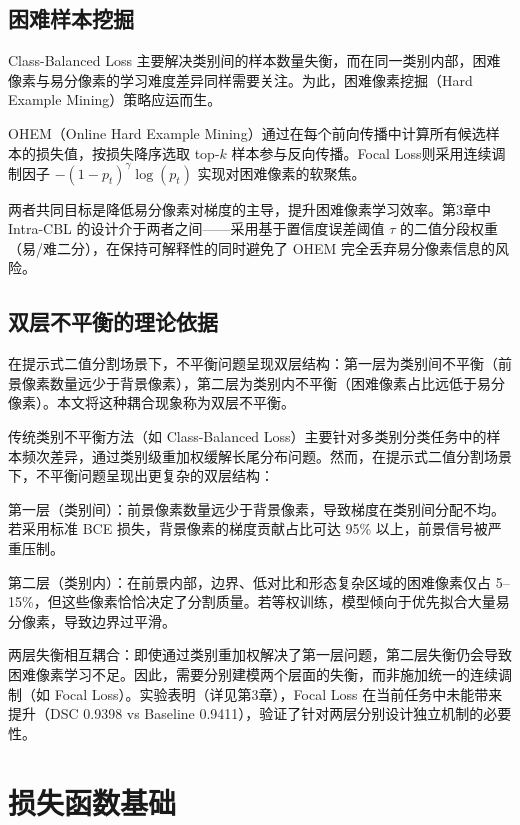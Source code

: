 \subsection{困难样本挖掘}

Class-Balanced Loss 主要解决类别间的样本数量失衡，而在同一类别内部，困难像素与易分像素的学习难度差异同样需要关注。为此，困难像素挖掘（Hard Example Mining）策略应运而生。

OHEM（Online Hard Example Mining）\cite{shrivastava2016ohem}通过在每个前向传播中计算所有候选样本的损失值，按损失降序选取 top-$k$ 样本参与反向传播。Focal Loss\cite{lin2017focal}则采用连续调制因子 $-(1-p_t)^\gamma \log(p_t)$ 实现对困难像素的软聚焦。

两者共同目标是降低易分像素对梯度的主导，提升困难像素学习效率。第3章中 Intra-CBL 的设计介于两者之间——采用基于置信度误差阈值 $\tau$ 的二值分段权重（易/难二分），在保持可解释性的同时避免了 OHEM 完全丢弃易分像素信息的风险。

\subsection{双层不平衡的理论依据}

在提示式二值分割场景下，不平衡问题呈现双层结构：第一层为类别间不平衡（前景像素数量远少于背景像素），第二层为类别内不平衡（困难像素占比远低于易分像素）。本文将这种耦合现象称为双层不平衡。

传统类别不平衡方法（如 Class-Balanced Loss）主要针对多类别分类任务中的样本频次差异，通过类别级重加权缓解长尾分布问题。然而，在提示式二值分割场景下，不平衡问题呈现出更复杂的双层结构：

第一层（类别间）：前景像素数量远少于背景像素，导致梯度在类别间分配不均。若采用标准 BCE 损失，背景像素的梯度贡献占比可达 95\% 以上，前景信号被严重压制。

第二层（类别内）：在前景内部，边界、低对比和形态复杂区域的困难像素仅占 5--15\%，但这些像素恰恰决定了分割质量。若等权训练，模型倾向于优先拟合大量易分像素，导致边界过平滑。

两层失衡相互耦合：即使通过类别重加权解决了第一层问题，第二层失衡仍会导致困难像素学习不足。因此，需要分别建模两个层面的失衡，而非施加统一的连续调制（如 Focal Loss）。实验表明（详见第3章），Focal Loss 在当前任务中未能带来提升（DSC 0.9398 vs Baseline 0.9411），验证了针对两层分别设计独立机制的必要性。

\section{损失函数基础}

